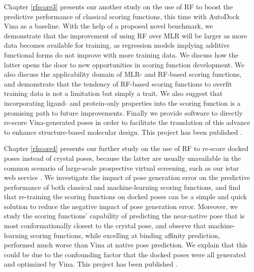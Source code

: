 Chapter \ref{rfscore3} presents our another study on the use of RF to boost the predictive performance of classical scoring functions, this time with AutoDock Vina \citep{595} as a baseline. With the help of a proposed novel benchmark, we demonstrate that the improvement of using RF over MLR will be larger as more data becomes available for training, as regression models implying additive functional forms do not improve with more training data. We discuss how the latter opens the door to new opportunities in scoring function development. We also discuss the applicability domain of MLR- and RF-based scoring functions, and demonstrate that the tendency of RF-based scoring functions to overfit training data is not a limitation but simply a trait. We also suggest that incorporating ligand- and protein-only properties into the scoring function is a promising path to future improvements. Finally we provide software to directly re-score Vina-generated poses in order to facilitate the translation of this advance to enhance structure-based molecular design. This project has been published \citep{1647,1433}.

Chapter \ref{rfscore4} presents our further study on the use of RF to re-score docked poses instead of crystal poses, because the latter are usually unavailable in the common scenario of large-scale prospective virtual screening, such as our istar web service \citep{1362}. We investigate the impact of pose generation error on the predictive performance of both classical and machine-learning scoring functions, and find that re-training the scoring functions on docked poses can be a simple and quick solution to reduce the negative impact of pose generation error. Moreover, we study the scoring functions' capability of predicting the near-native pose that is most conformationally closest to the crystal pose, and observe that machine-learning scoring functions, while excelling at binding affinity prediction, performed much worse than Vina at native pose prediction. We explain that this could be due to the confounding factor that the docked poses were all generated and optimized by Vina. This project has been published \citep{1434}.

